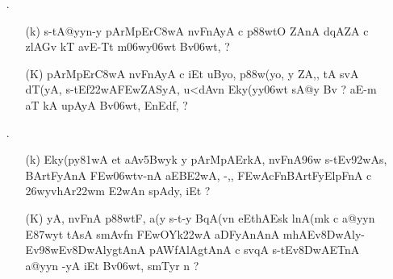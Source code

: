 \def\DevnagVersion{2.15}\documentclass{article}
\begin{document}
\begin{itemize}
\begin{itemize}
                \item[({\dn R})] {\dn gEZt>yOEtqAdy, s\2-tEv\38DwAfAKA, aAEnkEv\3E2wAnEv\38DwAEnkAy\? -v\2 -v uEct\2 pd\2 lB\?r i(y\?tdT\?{\qvb} k\? upAyA, BvE<d, Qy\306wt\? {\rs ?\re}}
               \end{itemize} 
               
  \item[{\dn \dnnum \rn{19}}.] \begin{itemize}
             
             \item[({\dn k})] {\dn s\2-tA@yyn-y pArMpEr\3C8wA\2 nvFnAyA\2 c p\388wtO ZAnA\2 d\?qAZA\2 c zlAGv\2 kT avE-Tt\2 m\306wy\306wt\? Bv\306wt, {\rs ?\re}}
             
             \item[({\dn K})] {\dn pArMpEr\3C8wA\2 nvFnAyA\2 c iEt uByo, p\388w(yo, y\? ZA,{\rs ,\re} tA svA\0 dT(yA, s\2-tEf\322wA\3FEwZASyA, u<dAvn\2 Eky(yy\0\306wt\2 sA@y\2 Bv\? {\rs ?\re} aE-m aT\?{\qvb} kA upAyA Bv\306wt, EnEd\0f\?, {\rs ?\re}}
             \end{itemize} 
             
             
 \item[{\dn \dnnum \rn{20}}.]  \begin{itemize}
                
                \item[({\dn k})] {\dn Eky(py\0\381wA et aAv\35Bwyk\2 y pArMpAErkA, nvFnA\396w s\2-tEv\392wA\2s, BArtFyAnA\2 \3FEw\306wtv-nA aEB\3E2wA, -,{\rs ,\re} \3FEwAcFnBArtFyElpFnA\2 c \326wyvhAr\322wm\2 \3E2wAn\2 s\2pAdy\?, iEt {\rs ?\re}}
                
                \item[({\dn K})] {\dn yA, nvFnA\2 p\388wtF, a(y s\2-t-y BqA(v\?n e\?EthAEsk\2 lnA(mk\2 c a@yyn\2 E\387wyt\?{\rs ,\re} tAsA\2 smAv\?fn\2 \3FEwOYk\322wA aDFyAnAnA\2 mhAEv\38DwAly{\rs -\re}Ev\398wEv\38DwAlygtAnA\2 pAWfAlAgtAnA\2 c sv\?{\qvb}qA\2 s\2-tEv\38DwAET\0nA a@yyn\? -yA iEt Bv\306wt, smT\0y\?r n {\rs ?\re}}
                \end{itemize}          
  
 \item[{\dn \dnnum \rn{22}}] \begin{itemize}
               

\end{itemize}
\end{itemize}
\end{document}
